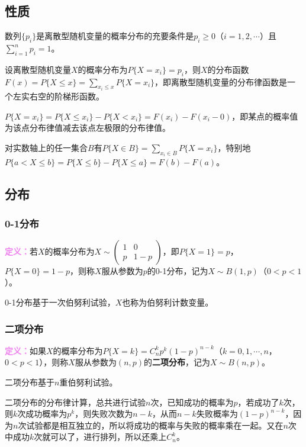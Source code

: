 \subsection{性质}

数列$\{p_i\}$是离散型随机变量的概率分布的充要条件是$p_i\geqslant0$（$i=1,2,\cdots$）且$\sum\limits_{i=1}^np_i=1$。

设离散型随机变量$X$的概率分布为$P\{X=x_i\}=p_i$，则$X$的分布函数$F(x)=P\{X\leqslant x\}=\sum\limits_{x_i\leqslant x}P\{X=x_i\}$，即离散型随机变量的分布律函数是一个左实右空的阶梯形函数。

$P\{X=x_i\}=P\{X\leqslant x_i\}-P\{X<x_i\}=F(x_i)-F(x_i-0)$，即某点的概率值为该点分布律值减去该点左极限的分布律值。

对实数轴上的任一集合$B$有$P\{X\in B\}=\sum\limits_{x_i\in B}P\{X=x_i\}$，特别地$P\{a<X\leqslant b\}=P\{X\leqslant b\}-P\{X\leqslant a\}=F(b)-F(a)$。

\subsection{分布}

\subsubsection{0-1分布}

\textcolor{violet}{\textbf{定义：}}若$X$的概率分布为$X\sim\left(\begin{array}{cc}
    1 & 0 \\
    p & 1-p
\end{array}\right)$，即$P\{X=1\}=p$，$P\{X=0\}=1-p$，则称$X$服从参数为$p$的0-1分布，记为$X\sim B(1,p)$（$0<p<1$）。

0-1分布基于一次伯努利试验，$X$也称为伯努利计数变量。

\subsubsection{二项分布}

\textcolor{violet}{\textbf{定义：}}如果$X$的概率分布为$P\{X=k\}=C_n^kp^k(1-p)^{n-k}$（$k=0,1,\cdots,n$，$0<p<1$），则称$X$服从参数为$(n,p)$的\textbf{二项分布}，记为$X\sim B(n,p)$。

二项分布基于$n$重伯努利试验。

二项分布的分布律计算，总共进行试验$n$次，已知成功的概率为$p$，若成功了$k$次，则$k$次成功概率为$p^k$，则失败次数为$n-k$，从而$n-k$失败概率为$(1-p)^{n-k}$，因为$n$次试验都是相互独立的，所以将成功的概率与失败的概率乘在一起。又在$n$次中成功$k$次就可以了，进行排列，所以还乘上$C_n^k$。


